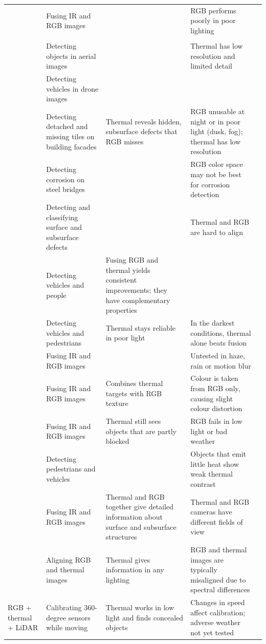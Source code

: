 {\begin{xltabular}{\textwidth}{>{\RaggedRight\arraybackslash}p{2.1cm}>{\RaggedRight\arraybackslash}p{2.9cm}>{\RaggedRight\arraybackslash}X>{\RaggedRight\arraybackslash}Xp{0.95cm}}
 & Fusing IR and RGB images &  & RGB performs poorly in poor lighting & \citep{Lin2026} \\
 &  &  &  & \citep{Gao2026} \\
 & Detecting objects in aerial images &  & Thermal has low resolution and limited detail & \citep{Liu2025a} \\
 & Detecting vehicles in drone images &  &  & \citep{Tang2026} \\
 & Detecting detached and missing tiles on building facades & Thermal reveals hidden, subsurface defects that RGB misses & RGB unusable at night or in poor light (dusk, fog); thermal has low resolution & \citep{Yang2023} \\
 & Detecting corrosion on steel bridges &  & RGB color space may not be best for corrosion detection & \citep{Lim2021} \\
 & Detecting and classifying surface and subsurface defects &  & Thermal and RGB are hard to align & \citep{Li2024c} \\
 & Detecting vehicles and people & Fusing RGB and thermal yields consistent improvements; they have complementary properties &  & \citep{Liu2025} \\
 & Detecting vehicles and pedestrians & Thermal stays reliable in poor light & In the darkest conditions, thermal alone beats fusion & \citep{Jiang2024} \\
 & Fusing IR and RGB images &  & Untested in haze, rain or motion blur & \citep{An2026} \\
 & Fusing IR and RGB images & Combines thermal targets with RGB texture & Colour is taken from RGB only, causing slight colour distortion & \citep{Xu2026} \\
 & Fusing IR and RGB images & Thermal still sees objects that are partly blocked & RGB fails in low light or bad weather & \citep{Chen2026a} \\
 & Detecting pedestrians and vehicles &  & Objects that emit little heat show weak thermal contrast & \citep{Wang2026b} \\
 & Fusing IR and RGB images & Thermal and RGB together give detailed information about surface and subsurface structures & Thermal and RGB cameras have different fields of view & \citep{Shahsavarani2024} \\
 & Aligning RGB and thermal images & Thermal gives information in any lighting & RGB and thermal images are typically misaligned due to spectral differences & \citep{Bin2023} \\
\midrule
RGB + thermal + LiDAR & Calibrating 360-degree sensors while moving & Thermal works in low light and finds concealed objects & Changes in speed affect calibration; adverse weather not yet tested & \citep{Tran2024} \\

\end{xltabular}}

